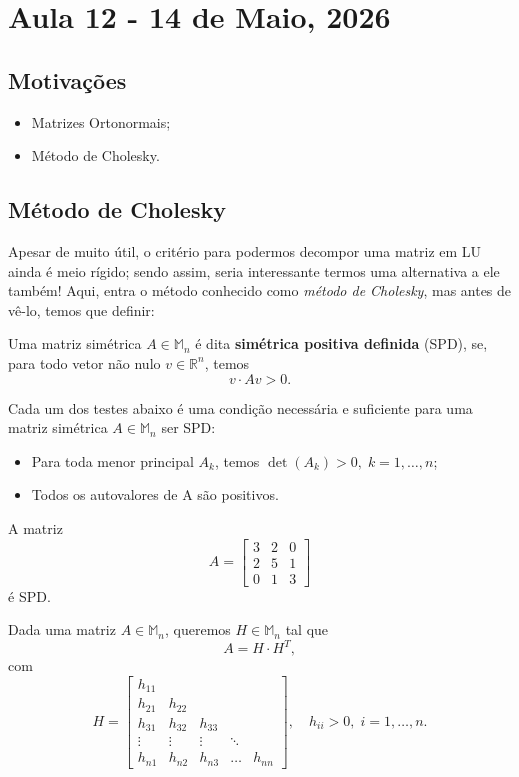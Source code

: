 \documentclass[../numerical_methods.tex]{subfiles}
\begin{document}
\section{Aula 12 - 14 de Maio, 2026}
\subsection{Motivações}
\begin{itemize}
	\item Matrizes Ortonormais;
	\item Método de Cholesky.
\end{itemize}
\subsection{Método de Cholesky}
Apesar de muito útil, o critério para podermos decompor uma matriz em LU ainda é meio rígido; sendo assim, seria interessante termos uma alternativa a ele também! Aqui, entra o método conhecido como \textit{método de Cholesky}, mas antes de vê-lo, temos que definir:
\begin{def*}
	Uma matriz simétrica \(A\in \mathbb{M}_{n}\) é dita \textbf{simétrica positiva definida} (SPD), se, para todo vetor não nulo \(v\in \mathbb{R}^{n}\), temos
	\[
		v \cdot Av > 0.
	\]
\end{def*}
\begin{prop*}
	Cada um dos testes abaixo é uma condição necessária e suficiente para uma matriz simétrica \(A\in \mathbb{M}_{n}\) ser SPD:
	\begin{itemize}
		\item[i)] Para toda menor principal \(A_{k}\), temos \(\det{(A_{k})} > 0,\; k=1, \dotsc, n\);
		\item[ii)] Todos os autovalores de A são positivos.
	\end{itemize}
\end{prop*}
\begin{example}
	A matriz
	\[
		A = \begin{bmatrix}
			3 & 2 & 0 \\
			2 & 5 & 1 \\
			0 & 1 & 3
		\end{bmatrix}
	\]
	é SPD.
\end{example}

Dada uma matriz \(A\in \mathbb{M}_{n}\), queremos \(H\in \mathbb{M}_{n}\) tal que
\[
	A = H \cdot H^{T},
\]
com
\[
	H = \begin{bmatrix}
		h_{11} &        &        &        &        \\
		h_{21} & h_{22} &        &                 \\
		h_{31} & h_{32} & h_{33} &        &        \\
		\vdots & \vdots & \vdots & \ddots &        \\
		h_{n1} & h_{n2} & h_{n3} & \dotsc & h_{nn}
	\end{bmatrix}, \quad h_{ii} > 0,\; i = 1, \dotsc , n.
\]
\end{document}
